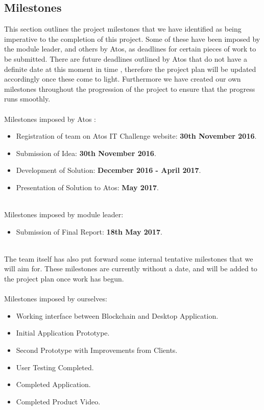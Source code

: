 \documentclass{article}
\begin{document}
\subsection{Milestones}
This section outlines the project milestones that we have identified as being imperative to the completion of this project. Some of these have been imposed by the module leader, and others by Atos, as deadlines for certain pieces of work to be submitted. There are future deadlines outlined by Atos that do not have a definite date at this moment in time \parencite{atosrules}, therefore the project plan will be updated accordingly once these come to light. Furthermore we have created our own milestones throughout the progression of the project to ensure that the progress runs smoothly.
\\
\\
Milestones imposed by Atos \parencite{atosrules}:
\begin{itemize}
    \item Registration of team on Atos IT Challenge website: \textbf{30th November 2016}.
    \item Submission of Idea: \textbf{30th November 2016}.
    \item Development of Solution: \textbf{December 2016 - April 2017}.
    \item Presentation of Solution to Atos: \textbf{May 2017}.
\end{itemize}
\ \\
Milestones imposed by module leader:
\begin{itemize}
    \item Submission of Final Report: \textbf{18th May 2017}.
\end{itemize}
\ \\
The team itself has also put forward some internal tentative milestones that we will aim for. These milestones are currently without a date, and will be added to the project plan once work has begun.
\\
\\
Milestones imposed by ourselves:
\begin{itemize}
    \item Working interface between Blockchain and Desktop Application.
    \item Initial Application Prototype.
    \item Second Prototype with Improvements from Clients.
    \item User Testing Completed.
    \item Completed Application.
    \item Completed Product Video.
\end{itemize}
\end{document}
